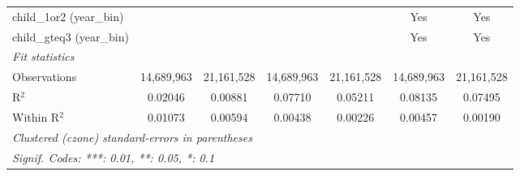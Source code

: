 \begin{tabular}{lcccccc}
child\_1or2 (year\_bin) &  &  &  &  & Yes & Yes\\
child\_gteq3 (year\_bin) &  &  &  &  & Yes & Yes\\
\midrule \emph{Fit statistics}&  & & & & & \\
Observations & 14,689,963&21,161,528&14,689,963&21,161,528&14,689,963&21,161,528\\
R$^2$ & 0.02046&0.00881&0.07710&0.05211&0.08135&0.07495\\
Within R$^2$ & 0.01073&0.00594&0.00438&0.00226&0.00457&0.00190\\
\midrule\midrule\multicolumn{7}{l}{\emph{Clustered (czone) standard-errors in parentheses}}\\
\multicolumn{7}{l}{\emph{Signif. Codes: ***: 0.01, **: 0.05, *: 0.1}}\\
\end{tabular}


